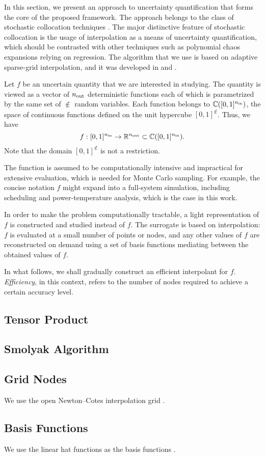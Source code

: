 In this section, we present an approach to uncertainty quantification that forms
the core of the proposed framework. The approach belongs to the class of
stochastic collocation techniques \cite{xiu2010}. The major distinctive feature
of stochastic collocation is the usage of interpolation as a means of
uncertainty quantification, which should be contrasted with other techniques
such as polynomial chaos expansions relying on regression. The algorithm that we
use is based on adaptive sparse-grid interpolation, and it was developed in
\cite{klimke2006} and \cite{ma2009}.

Let $f$ be an uncertain quantity that we are interested in studying. The
quantity is viewed as a vector of ${n_\text{out}}$ deterministic functions each of which
is parametrized by the same set of $\nin$ random variables. Each function
belongs to $\mathbb{C}([0, 1]^{n_\text{in}})$, the space of continuous functions defined
on the unit hypercube $[0, 1]^\nin$. Thus, we have
\[
  f: [0, 1]^{n_\text{in}} \to \mathbb{R}^{n_\text{out}} \subset \mathbb{C}([0, 1]^{n_\text{in}}).
\]
Note that the domain $[0, 1]^\nin$ is not a restriction.

The function is assumed to be computationally intensive and impractical for
extensive evaluation, which is needed for Monte Carlo sampling. For example, the
concise notation $f$ might expand into a full-system simulation, including
scheduling and power-temperature analysis, which is the case in this work.

In order to make the problem computationally tractable, a light representation
of $f$ is constructed and studied instead of $f$. The surrogate is based on
interpolation: $f$ is evaluated at a small number of points or nodes, and any
other values of $f$ are reconstructed on demand using a set of basis functions
mediating between the obtained values of $f$.

In what follows, we shall gradually construct an efficient interpolant for $f$.
\emph{Efficiency}, in this context, refers to the number of nodes required to
achieve a certain accuracy level.

\subsection{Tensor Product}


\subsection{Smolyak Algorithm}


\subsection{Grid Nodes}
We use the open Newton--Cotes interpolation grid \cite{klimke2006}.

\subsection{Basis Functions}
We use the linear hat functions as the basis functions \cite{klimke2006}.


